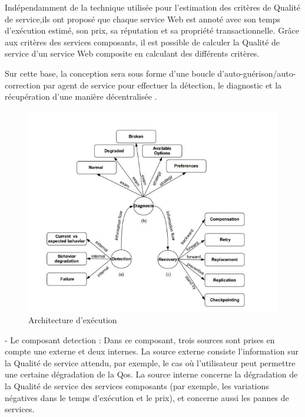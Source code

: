 Indépendamment de la technique utilisée pour l'estimation des critères de Qualité de service,ils ont proposé que chaque service Web est annoté avec son temps d'exécution estimé, son prix, sa réputation et sa propriété transactionnelle. Grâce aux critères des services composants, il est possible de calculer la Qualité de service d'un service Web composite en calculant des différents critères.

Sur cette base, la conception sera sous forme d'une boucle d'auto-guérison/auto-correction par agent de service pour effectuer la détection, le diagnostic et la récupération d'une manière décentralisée \cite{1}.


\begin{figure}[H]
\begin{center}
\includegraphics[width=1\linewidth]{images/Boucle auto-corrective des Agents de Service.jpg}
\end{center}
\caption{Architecture d'exécution \cite{1}}
\label{fig:5}
\end{figure}

- Le composant detection : Dans ce composant, trois sources sont prises en compte une externe et deux internes. 
La source externe consiste l'information sur la Qualité de service attendu, par exemple, le cas où l'utilisateur peut permettre une certaine dégradation de la Qos.
La source interne concerne la dégradation de la Qualité de service des services composants (par exemple, les variations négatives dans le temps d'exécution et le prix), et concerne aussi les pannes de services.

